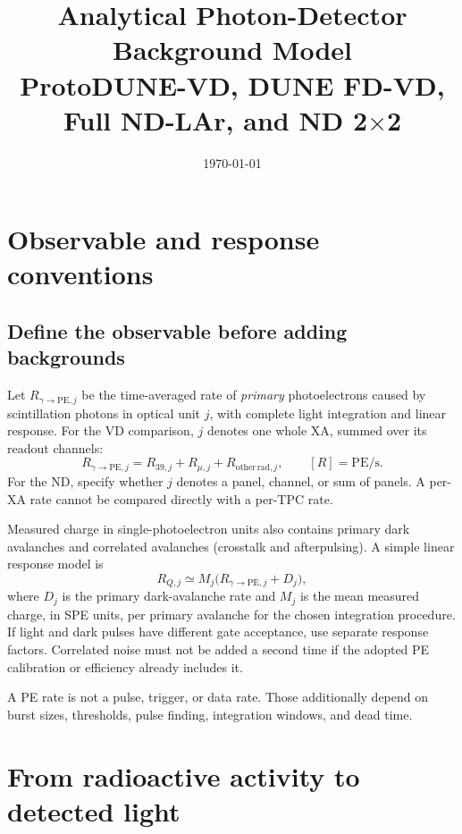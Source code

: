 \documentclass[11pt]{article}
\title{Analytical Photon-Detector Background Model\\
ProtoDUNE-VD, DUNE FD-VD, Full ND-LAr, and ND 2$\times$2}
\author{}
\date{\today}
\begin{document}
\maketitle



\section{Observable and response conventions}

\subsection{Define the observable before adding backgrounds}

Let $R_{\gamma\to\mathrm{PE},j}$ be the time-averaged rate of
\emph{primary} photoelectrons caused by scintillation photons in optical
unit $j$, with complete light integration and linear response. For the VD
comparison, $j$ denotes one whole XA, summed over its readout channels:
\begin{equation}
R_{\gamma\to\mathrm{PE},j}
=R_{39,j}+R_{\mu,j}+R_{\mathrm{other\,rad},j},
\qquad [R]=\mathrm{PE/s}.
\label{eq:components}
\end{equation}
For the ND, specify whether $j$ denotes a panel, channel, or sum of panels.
A per-XA rate cannot be compared directly with a per-TPC rate.

Measured charge in single-photoelectron units also contains primary dark
avalanches and correlated avalanches (crosstalk and afterpulsing). A simple
linear response model is
\begin{equation}
R_{Q,j}\simeq M_j\bigl(R_{\gamma\to\mathrm{PE},j}+D_j\bigr),
\label{eq:noise}
\end{equation}
where $D_j$ is the primary dark-avalanche rate and $M_j$ is the mean measured
charge, in SPE units, per primary avalanche for the chosen integration
procedure. If light and dark pulses have different gate acceptance, use
separate response factors. Correlated noise must not be added a second time
if the adopted PE calibration or efficiency already includes it.

A PE rate is not a pulse, trigger, or data rate. Those additionally depend on
burst sizes, thresholds, pulse finding, integration windows, and dead time.

\section{From radioactive activity to detected light}
\label{sec:kernel}
\end{document}
